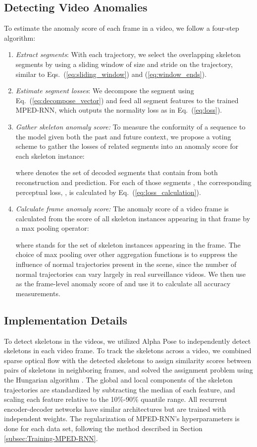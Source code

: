 \subsection{Detecting Video Anomalies}

To estimate the anomaly score of each frame in a video, we follow
a four-step algorithm:
\begin{enumerate}
\item \emph{Extract segments}: With each trajectory, we select the overlapping
skeleton segments by using a sliding window of size  and stride
 on the trajectory, similar to Eqs.~(\ref{eq:sliding_window})
and (\ref{eq:window_ends}). 
\item \emph{Estimate segment losses}: We decompose the segment using Eq.~(\ref{eq:decompose_vector})
and feed all segment features to the trained MPED-RNN, which outputs
the normality loss as in Eq.~(\ref{eq:loss}).
\item \emph{Gather skeleton anomaly score: }To measure the conformity of
a sequence to the model given both the past and future context, we
propose a voting scheme to gather the losses of related segments into
an anomaly score for each skeleton instance:

 where  denotes the set of decoded segments that contain 
from both reconstruction and prediction. For each of those segments
, the corresponding perceptual loss, , is calculated
by Eq.~(\ref{eq:loss_calculation}).
\item \emph{Calculate frame anomaly score:} The anomaly score of a video
frame  is calculated from the score of all skeleton instances
appearing in that frame by a max pooling operator:

where  stands for the set of skeleton instances
appearing in the frame. The choice of max pooling over other aggregation
functions is to suppress the influence of normal trajectories present
in the scene, since the number of normal trajectories can vary largely
in real surveillance videos. We then use  as the
frame-level anomaly score of  and use it to calculate all
accuracy measurements. 
\end{enumerate}

\subsection{Implementation Details}

To detect skeletons in the videos, we utilized Alpha Pose \cite{fang2017rmpe}
to independently detect skeletons in each video frame. To track the
skeletons across a video, we combined sparse optical flow with the
detected skeletons to assign similarity scores between pairs of skeletons
in neighboring frames, and solved the assignment problem using the
Hungarian algorithm \cite{kuhn1955hungarian}. The global and local
components of the skeleton trajectories are standardized by subtracting
the median of each feature, and scaling each feature relative to the
10\%-90\% quantile range. All recurrent encoder-decoder networks have
similar architectures but are trained with independent weights. The
regularization of MPED-RNN's hyperparameters is done for each data
set, following the method described in Section \ref{subsec:Training-MPED-RNN}.
